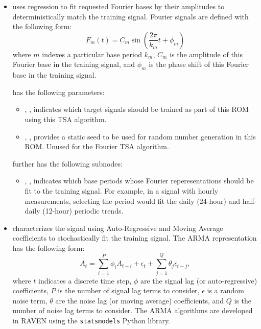 \begin{itemize}
  \item {} uses regression to fit requested Fourier bases by their amplitudes to
    deterministically match the training signal. Fourier signals are defined with the following form:
    \begin{equation*}
      F_m(t) = C_m\sin\left( \frac{2\pi}{k_m}t + \phi_m\right)
    \end{equation*}
    where $m$ indexes a particular base period $k_m$, $C_m$ is the amplitude of this Fourier base in the
    training signal, and $\phi_m$ is the phase shift of this Fourier base in the training signal.

     has the following parameters:
    \begin{itemize}
      \item {}, , indicates which
        target signals should be trained as part of this ROM using this TSA algorithm.
      \item {}, , provides a static seed to be used for
        random number generation in this ROM. Unused for the Fourier TSA algorithm.
    \end{itemize}
     further has the following subnodes:
    \begin{itemize}
      \item {}, , indicates which base
        periods whose Fourier reperesentations should be fit to the training signal. For example, in
        a signal with hourly measurements, selecting the period  would fit the daily
        (24-hour) and half-daily (12-hour) periodic trends.
    \end{itemize}

  \item {} characterizes the signal using Auto-Regressive and Moving Average
    coefficients to stochastically fit the training signal.
    The ARMA representation has the following form:
    \begin{equation*}
      A_t = \sum_{i=1}^P \phi_i A_{t-i} + \epsilon_t + \sum_{j=1}^Q \theta_j \epsilon_{t-j},
    \end{equation*}
    where $t$ indicates a discrete time step, $\phi$ are the signal lag (or auto-regressive)
    coefficients, $P$ is the number of signal lag terms to consider, $\epsilon$ is a random noise
    term, $\theta$ are the noise lag (or moving average) coefficients, and $Q$ is the number of
    noise lag terms to consider. The ARMA algorithms are developed in RAVEN using the
    \texttt{statsmodels} Python library.


\end{itemize}

